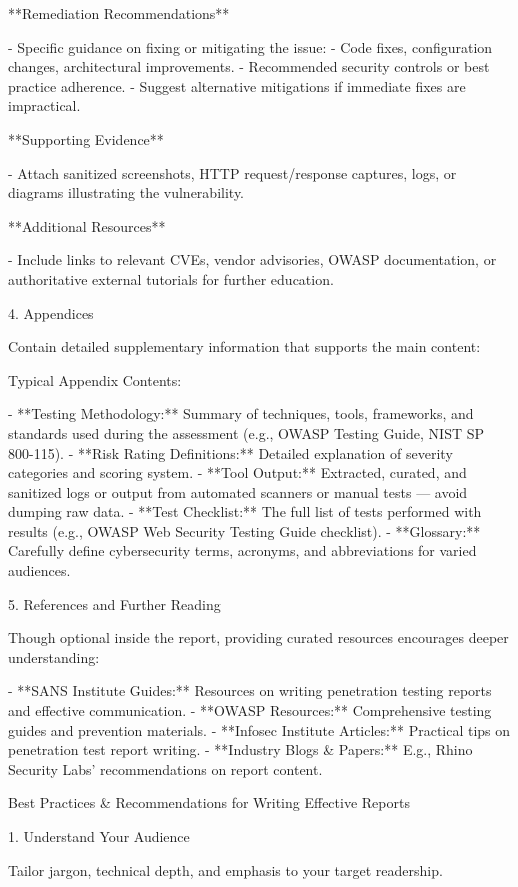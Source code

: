 **Remediation Recommendations**

- Specific guidance on fixing or mitigating the issue:
    - Code fixes, configuration changes, architectural improvements.
    - Recommended security controls or best practice adherence.
- Suggest alternative mitigations if immediate fixes are impractical.

**Supporting Evidence**

- Attach sanitized screenshots, HTTP request/response captures, logs, or diagrams illustrating the vulnerability.

**Additional Resources**

- Include links to relevant CVEs, vendor advisories, OWASP documentation, or authoritative external tutorials for further education.


4. Appendices

Contain detailed supplementary information that supports the main content:

Typical Appendix Contents:

- **Testing Methodology:** Summary of techniques, tools, frameworks, and standards used during the assessment (e.g., OWASP Testing Guide, NIST SP 800-115).
- **Risk Rating Definitions:** Detailed explanation of severity categories and scoring system.
- **Tool Output:** Extracted, curated, and sanitized logs or output from automated scanners or manual tests — avoid dumping raw data.
- **Test Checklist:** The full list of tests performed with results (e.g., OWASP Web Security Testing Guide checklist).
- **Glossary:** Carefully define cybersecurity terms, acronyms, and abbreviations for varied audiences.


5. References and Further Reading

Though optional inside the report, providing curated resources encourages deeper understanding:

- **SANS Institute Guides:** Resources on writing penetration testing reports and effective communication.
- **OWASP Resources:** Comprehensive testing guides and prevention materials.
- **Infosec Institute Articles:** Practical tips on penetration test report writing.
- **Industry Blogs \& Papers:** E.g., Rhino Security Labs’ recommendations on report content.


Best Practices \& Recommendations for Writing Effective Reports

1. Understand Your Audience

Tailor jargon, technical depth, and emphasis to your target readership.

